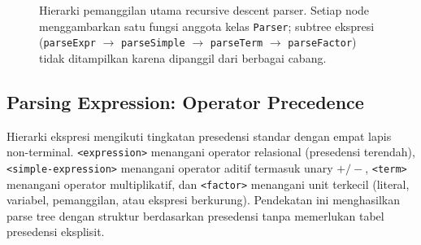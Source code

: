 \documentclass[11pt,a4paper]{article}
\begin{document}
\begin{figure}[H]
\centering
{}
\caption{Hierarki pemanggilan utama recursive descent parser. Setiap node
menggambarkan satu fungsi anggota kelas \texttt{Parser}; subtree ekspresi
(\texttt{parseExpr} $\to$ \texttt{parseSimple} $\to$ \texttt{parseTerm} $\to$
\texttt{parseFactor}) tidak ditampilkan karena dipanggil dari berbagai cabang.}
\label{fig:rd-call}
\end{figure}

\subsection{Parsing Expression: Operator Precedence}

Hierarki ekspresi mengikuti tingkatan presedensi standar dengan empat lapis
non-terminal. \texttt{<expression>} menangani operator relasional (presedensi
terendah), \texttt{<simple-expression>} menangani operator aditif termasuk
unary $+/-$, \texttt{<term>} menangani operator multiplikatif, dan
\texttt{<factor>} menangani unit terkecil (literal, variabel, pemanggilan, atau
ekspresi berkurung). Pendekatan ini menghasilkan parse tree dengan struktur
berdasarkan presedensi tanpa memerlukan tabel presedensi eksplisit.
\end{document}
